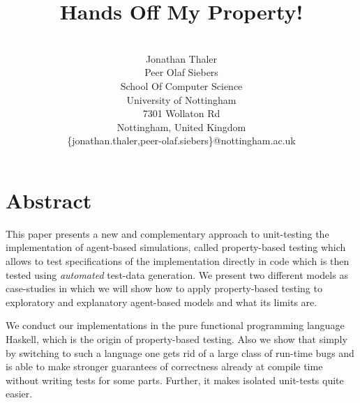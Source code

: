 \documentclass{scspaperproc}
\begin{document}


\title{Hands Off My Property!}

\author{
\\%
Jonathan Thaler \\ 
Peer Olaf Siebers \\ [12pt] 
School Of Computer Science \\
University of Nottingham \\
7301 Wollaton Rd \\
Nottingham, United Kingdom \\
\{jonathan.thaler,peer-olaf.siebers\}@nottingham.ac.uk\\
}



\maketitle

\section*{Abstract}

This paper presents a new and complementary approach to unit-testing the implementation of agent-based simulations, called property-based testing which allows to test specifications of the implementation directly in code which is then tested using \textit{automated} test-data generation. We present two different models as case-studies in which we will show how to apply property-based testing to exploratory and explanatory agent-based models and what its limits are.

We conduct our implementations in the pure functional programming language Haskell, which is the origin of property-based testing. Also we show that simply by switching to such a language one gets rid of a large class of run-time bugs and is able to make stronger guarantees of correctness already at compile time without writing tests for some parts. Further, it makes isolated unit-tests quite easier.
\end{document}

